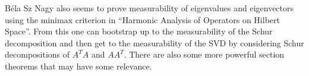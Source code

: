 B\'{e}la Sz Nagy also seems to prove measurability of eigenvalues and eigenvectors using the minimax criterion in ``Harmonic Analysis of Operators on Hilbert Space''.  From this one can bootstrap up to the measurability of the Schur decomposition and then get to the measurability of the SVD by considering Schur decompositions of $A^TA$ and $AA^T$.  There are also some more powerful section theorems that may have some relevance.